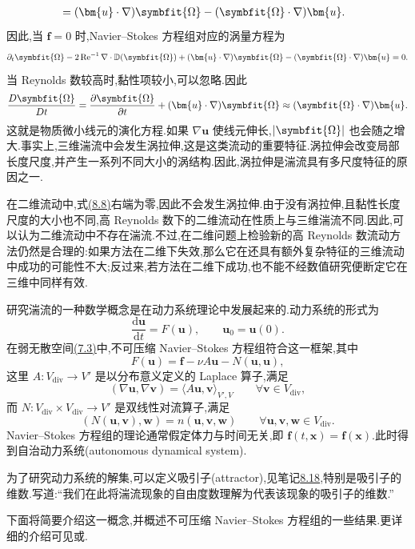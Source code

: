 \begin{note}[二维流动与三维流动的差异]
\[\begin{aligned}
 &=(\bm{u}\cdot\nabla)\symbfit{\Omega}
   -(\symbfit{\Omega}\cdot\nabla)\bm{u}.
\end{aligned}
\]
因此,当 $\bm{f}=0$ 时,Navier--Stokes 方程组对应的涡量方程为
\[
 \partial_t\symbfit{\Omega}
 -2\operatorname{Re}^{-1}\nabla\cdot\mathbb{D}(\symbfit{\Omega})
 +(\bm{u}\cdot\nabla)\symbfit{\Omega}
 -(\symbfit{\Omega}\cdot\nabla)\bm{u}=0.
\]
当 Reynolds 数较高时,黏性项较小,可以忽略.因此
\begin{equation}\label{eq:vorticity-transport-vortex-stretching}
 \frac{D\symbfit{\Omega}}{Dt}
  =\frac{\partial\symbfit{\Omega}}{\partial t}
    +(\bm{u}\cdot\nabla)\symbfit{\Omega}
  \approx(\symbfit{\Omega}\cdot\nabla)\bm{u}.
\end{equation}
这就是物质微小线元的演化方程.如果 $\nabla\bm{u}$ 使线元伸长,$|\symbfit{\Omega}|$ 也会随之增大.事实上,三维湍流中会发生涡拉伸,这是这类流动的重要特征.涡拉伸会改变局部长度尺度,并产生一系列不同大小的涡结构.因此,涡拉伸是湍流具有多尺度特征的原因之一.

在二维流动中,式\hyperref[eq:vorticity-transport-vortex-stretching]{(8.8)}右端为零,因此不会发生涡拉伸.由于没有涡拉伸,且黏性长度尺度的大小也不同,高 Reynolds 数下的二维流动在性质上与三维湍流不同.因此,可以认为二维流动中不存在湍流.不过,在二维问题上检验新的高 Reynolds 数流动方法仍然是合理的:如果方法在二维下失效,那么它在还具有额外复杂特征的三维流动中成功的可能性不大;反过来,若方法在二维下成功,也不能不经数值研究便断定它在三维中同样有效.
\end{note}

\begin{note}[研究湍流的数学方法]
\label{note:dynamical-systems-turbulence}
研究湍流的一种数学概念是在动力系统理论中发展起来的.动力系统的形式为
\begin{equation}\label{eq:dynamical-system-abstract}
 \frac{\mathrm{d}\bm{u}}{\mathrm{d}t}
  =F(\bm{u}),
 \qquad \bm{u}_0=\bm{u}(0).
\end{equation}
在弱无散空间\hyperref[eq:time-dependent-ns-weak-first]{(7.3)}中,不可压缩 Navier--Stokes 方程组符合这一框架,其中
\[
 F(\bm{u})=\bm{f}-\nu A\bm{u}-N(\bm{u},\bm{u}),
\]
这里 $A:V_{\mathrm{div}}\to V'$ 是以分布意义定义的 Laplace 算子,满足
\[
 (\nabla\bm{u},\nabla\bm{v})
  =\langle A\bm{u},\bm{v}\rangle_{V',V}
  \qquad\forall\bm{v}\in V_{\mathrm{div}},
\]
而 $N:V_{\mathrm{div}}\times V_{\mathrm{div}}\to V'$ 是双线性对流算子,满足
\[
 (N(\bm{u},\bm{v}),\bm{w})
  =n(\bm{u},\bm{v},\bm{w})
  \qquad\forall\bm{u},\bm{v},\bm{w}\in V_{\mathrm{div}}.
\]
Navier--Stokes 方程组的理论通常假定体力与时间无关,即 $\bm{f}(t,\bm{x})=\bm{f}(\bm{x})$.此时得到自治动力系统(autonomous dynamical system).

为了研究动力系统的解集,可以定义吸引子(attractor),见笔记\hyperref[note:global-attractor]{8.18},特别是吸引子的维数.\textcite[p.~380]{Temam1997}写道:“我们在此将湍流现象的自由度数理解为代表该现象的吸引子的维数.”

下面将简要介绍这一概念,并概述不可压缩 Navier--Stokes 方程组的一些结果.更详细的介绍可见\textcite[第 III 章]{FoiasManleyRosaTemam2001}或\textcite[第 13 章]{MarionTemam1998}.
\end{note}

